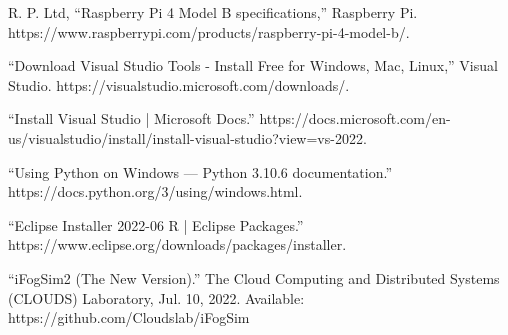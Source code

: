 \documentclass[10pt]{article}
\begin{document}
\begin{thebibliography}{40}

 R. P. Ltd, “Raspberry Pi 4 Model B specifications,” Raspberry Pi. https://www.raspberrypi.com/products/raspberry-pi-4-model-b/.

 “Download Visual Studio Tools - Install Free for Windows, Mac, Linux,” Visual Studio. https://visualstudio.microsoft.com/downloads/.

 “Install Visual Studio | Microsoft Docs.” https://docs.microsoft.com/en-us/visualstudio/install/install-visual-studio?view=vs-2022.

 “Using Python on Windows — Python 3.10.6 documentation.” https://docs.python.org/3/using/windows.html.

 “Eclipse Installer 2022-06 R | Eclipse Packages.” https://www.eclipse.org/downloads/packages/installer.

 “iFogSim2 (The New Version).” The Cloud Computing and Distributed Systems (CLOUDS) Laboratory, Jul. 10, 2022. Available: https://github.com/Cloudslab/iFogSim


\end{thebibliography}
\end{document}
